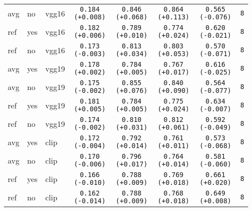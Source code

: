 \begin{tabular}{|l|l|l|c|c|c|c|c|}
avg & no & vgg16 & \texttt{0.184 {\color{green}(+0.008)}} & \texttt{0.846 {\color{red}(+0.068)}} & \texttt{0.864 {\color{red}(+0.113)}} & \texttt{0.565 {\color{red}(-0.076)}} & \texttt{8} \\
ref & yes & vgg16 & \texttt{0.182 {\color{green}(+0.006)}} & \texttt{0.789 {\color{red}(+0.010)}} & \texttt{0.774 {\color{red}(+0.024)}} & \texttt{0.620 {\color{red}(-0.021)}} & \texttt{8} \\
ref & no & vgg16 & \texttt{0.173 {\color{red}(-0.003)}} & \texttt{0.813 {\color{red}(+0.034)}} & \texttt{0.803 {\color{red}(+0.053)}} & \texttt{0.570 {\color{red}(-0.071)}} & \texttt{8} \\
\hline
avg & yes & vgg19 & \texttt{0.178 {\color{green}(+0.002)}} & \texttt{0.784 {\color{red}(+0.005)}} & \texttt{0.767 {\color{red}(+0.017)}} & \texttt{0.616 {\color{red}(-0.025)}} & \texttt{8} \\
avg & no & vgg19 & \texttt{0.175 {\color{red}(-0.002)}} & \texttt{0.855 {\color{red}(+0.076)}} & \texttt{0.840 {\color{red}(+0.090)}} & \texttt{0.564 {\color{red}(-0.077)}} & \texttt{8} \\
ref & yes & vgg19 & \texttt{0.181 {\color{green}(+0.005)}} & \texttt{0.784 {\color{red}(+0.005)}} & \texttt{0.775 {\color{red}(+0.024)}} & \texttt{0.634 {\color{red}(-0.007)}} & \texttt{8} \\
ref & no & vgg19 & \texttt{0.174 {\color{red}(-0.002)}} & \texttt{0.810 {\color{red}(+0.031)}} & \texttt{0.812 {\color{red}(+0.061)}} & \texttt{0.592 {\color{red}(-0.049)}} & \texttt{8} \\
\hline
avg & yes & clip & \texttt{0.172 {\color{red}(-0.004)}} & \texttt{0.792 {\color{red}(+0.014)}} & \texttt{0.761 {\color{red}(+0.011)}} & \texttt{0.573 {\color{red}(-0.068)}} & \texttt{8} \\
avg & no & clip & \texttt{0.170 {\color{red}(-0.006)}} & \texttt{0.796 {\color{red}(+0.017)}} & \texttt{0.764 {\color{red}(+0.014)}} & \texttt{0.581 {\color{red}(-0.060)}} & \texttt{8} \\
ref & yes & clip & \texttt{0.166 {\color{red}(-0.010)}} & \texttt{0.788 {\color{red}(+0.009)}} & \texttt{0.769 {\color{red}(+0.018)}} & \texttt{0.661 {\color{green}(+0.020)}} & \texttt{8} \\
ref & no & clip & \texttt{0.162 {\color{red}(-0.014)}} & \texttt{0.788 {\color{red}(+0.009)}} & \texttt{0.768 {\color{red}(+0.018)}} & \texttt{0.649 {\color{green}(+0.008)}} & \texttt{8} \\
\hline
\end{tabular}
